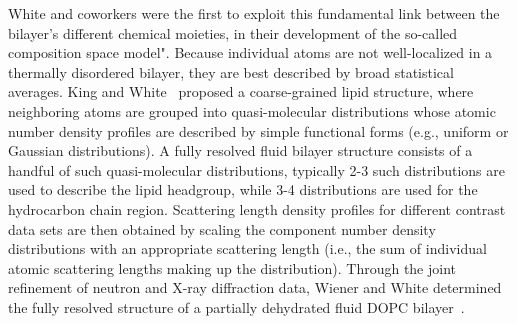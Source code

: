 \documentclass[8.5pt,twoside,twocolumn]{article}
\begin{document}
White and coworkers were the first to exploit this fundamental link between the bilayer's different chemical moieties, in their development of the so-called composition space model". Because individual atoms are not well-localized in a thermally disordered bilayer, they are best described by broad statistical averages. King and White~\cite{King.1986} proposed a coarse-grained lipid structure, where neighboring atoms are grouped into quasi-molecular distributions whose atomic number density profiles are described by simple functional forms (e.g., uniform or Gaussian distributions). A fully resolved fluid bilayer structure consists of a handful of such quasi-molecular distributions, typically 2-3 such distributions are used to describe the lipid headgroup, while 3-4 distributions are used for the hydrocarbon chain region. Scattering length density profiles for different contrast data sets are then obtained by scaling the component number density distributions with an appropriate scattering length (i.e., the sum of individual atomic scattering lengths making up the distribution). Through the joint refinement of neutron and X-ray diffraction data, Wiener and White determined the fully resolved structure of a partially dehydrated fluid DOPC bilayer~\cite{Wiener.1991,Wiener.1991b,Wiener.1991c,Wiener.1992,Wiener.1992b}.
\end{document}
